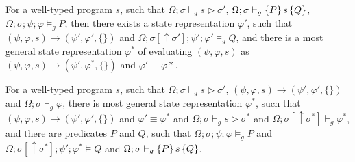 \begin{theorem}\label{thm:proof-soundness}\rm 
For a well-typed program $s$, such that $\Omega;\sigma\vdash_g s \triangleright \sigma'$, $\Omega;\sigma\vdash_{g}\{P\}\, s \,\{Q\}$, $\Omega;\sigma;\psi;\varphi\models_g P$, then there exists a state representation $\varphi'$, such that $(\psi,\varphi,s)\longrightarrow (\psi',\varphi',\{\})$ and $\Omega;\sigma[\uparrow\sigma'];\psi';\varphi'\models_g Q$, and there is a most general state representation $\varphi^*$ of evaluating $(\psi,\varphi,s)$ as $(\psi,\varphi,s)\longrightarrow (\psi',\varphi^*,\{\})$ and $\varphi' \equiv \varphi*$.
\end{theorem}

\begin{theorem}\label{thm:proof-completeness}\rm 
For a well-typed program $s$, such that $\Omega;\sigma\vdash_g s \triangleright \sigma'$, $(\psi,\varphi,s)\longrightarrow (\psi',\varphi',\{\})$ and $\Omega;\sigma\vdash_g \varphi$, there is most general state representation $\varphi^*$, such that $(\psi,\varphi,s)\longrightarrow (\psi',\varphi',\{\})$ and $\varphi' \equiv \varphi^*$ and $\Omega;\sigma\vdash_g s \triangleright \sigma^*$ and $\Omega;\sigma[\uparrow \sigma^*]\vdash_g \varphi^*$, and there are predicates $P$ and $Q$, such that $\Omega;\sigma;\psi;\varphi\models_g P$ and $\Omega;\sigma[\uparrow\sigma^*];\psi';\varphi^* \models Q$ and $\Omega;\sigma\vdash_{g}\{P\}\, s \,\{Q\}$.
\end{theorem}




